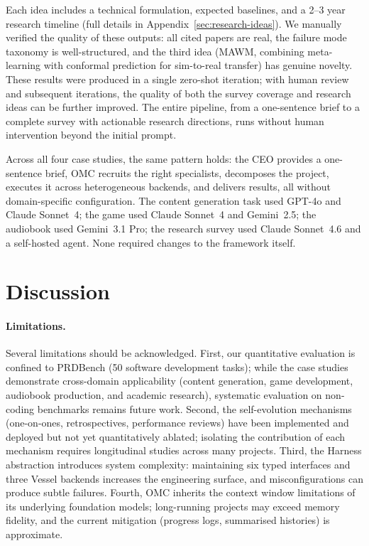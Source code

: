\documentclass[11pt,a4paper]{article}
\begin{document}
\noindent Each idea includes a technical formulation, expected baselines, and a 2--3 year research timeline (full details in Appendix~\ref{sec:research-ideas}).  We manually verified the quality of these outputs: all cited papers are real, the failure mode taxonomy is well-structured, and the third idea (MAWM, combining meta-learning with conformal prediction for sim-to-real transfer) has genuine novelty.  These results were produced in a single zero-shot iteration; with human review and subsequent iterations, the quality of both the survey coverage and research ideas can be further improved.  The entire pipeline, from a one-sentence brief to a complete survey with actionable research directions, runs without human intervention beyond the initial prompt.

Across all four case studies, the same pattern holds: the CEO provides a one-sentence brief, OMC recruits the right specialists, decomposes the project, executes it across heterogeneous backends, and delivers results, all without domain-specific configuration.  The content generation task used GPT-4o and Claude Sonnet~4; the game used Claude Sonnet~4 and Gemini~2.5; the audiobook used Gemini~3.1 Pro; the research survey used Claude Sonnet~4.6 and a self-hosted agent.  None required changes to the framework itself.


\section{Discussion}
\label{sec:discussion}

\paragraph{Limitations.}
Several limitations should be acknowledged.  First, our quantitative evaluation is confined to PRDBench (50 software development tasks); while the case studies demonstrate cross-domain applicability (content generation, game development, audiobook production, and academic research), systematic evaluation on non-coding benchmarks remains future work.  Second, the self-evolution mechanisms (one-on-ones, retrospectives, performance reviews) have been implemented and deployed but not yet quantitatively ablated; isolating the contribution of each mechanism requires longitudinal studies across many projects.  Third, the Harness abstraction introduces system complexity: maintaining six typed interfaces and three Vessel backends increases the engineering surface, and misconfigurations can produce subtle failures.  Fourth, OMC inherits the context window limitations of its underlying foundation models; long-running projects may exceed memory fidelity, and the current mitigation (progress logs, summarised histories) is approximate.  
\end{document}
